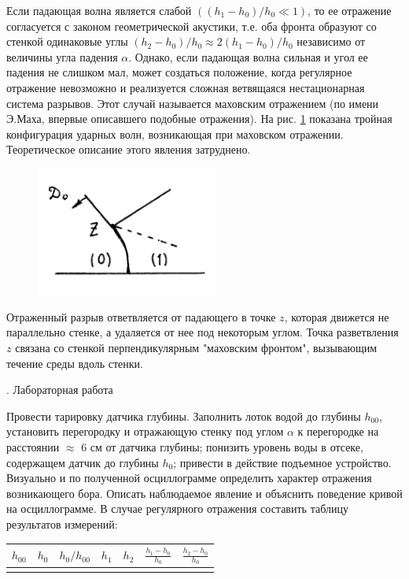 \documentclass[specialist, subf, href, colorlinks=true, 14pt, final]{disser}
\theoremstyle{definition}
\begin{document}
Если падающая волна является слабой $((h_{1}-h_{0})/h_{0} \ll 1)$, то ее отражение согласуется с законом геометрической акустики, т.е. оба фронта образуют со стенкой одинаковые углы $(h_{2}-h_{0})/h_{0} \approx 2(h_{1}-h_{0})/h_{0}$ независимо от величины угла падения $\alpha$. Однако, если падающая волна сильная и угол ее падения не слишком мал, может создаться положение, когда регулярное отражение невозможно и реализуется сложная ветвящаяся нестационарная система разрывов. Этот случай называется маховским отражением (по имени Э.Маха, впервые описавшего подобные отражения). На рис. \ref{1-4-8} показана тройная конфигурация ударных волн, возникающая при маховском отражении. Теоретическое описание этого явления затруднено. 
\begin{figure} 
  \includegraphics[width=60mm]{pics/1-4-8.png}
  \caption{}
  \label{1-4-8}
\end{figure}
Отраженный  разрыв ответвляется от падающего в точке $z$, которая движется не параллельно стенке, а удаляется от нее под некоторым углом. Точка разветвления $z$ связана со стенкой перпендикулярным "маховским фронтом"{}, вызывающим течение среды вдоль стенки.

. Лабораторная работа

Провести тарировку датчика глубины. Заполнить лоток водой до глубины $h_{00}$, установить перегородку и отражающую стенку под углом $\alpha$ к перегородке на расстоянии $\approx$ 6 см от датчика глубины; понизить уровень воды в отсеке, содержащем датчик до глубины $h_0$; привести в действие подъемное устройство. Визуально и по полученной осциллограмме определить характер отражения возникающего бора. Описать наблюдаемое явление и объяснить поведение кривой на осциллограмме. В случае регулярного отражения составить таблицу результатов измерений:
\begin{center}
  {\large
  \begin{tabular}{|c|c|c|c|c|c|c|}
  \hline
  $h_{00}$ & $h_0$ & $h_{0}/h_{00}$ & $h_1$ & $h_2$ & $\frac{h_{1}-h_{0}}{h_0}$ & $\frac{h_{2}-h_{0}}{h_0}$\\
  \hline
  & & & & & & \\
  \hline
  \end{tabular}
  }
\end{center}
\end{document}
